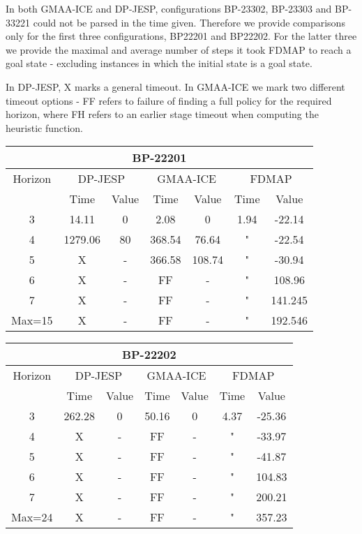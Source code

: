 \documentclass[letterpaper]{article} %
\begin{document}
In both GMAA-ICE and DP-JESP, configurations BP-23302, BP-23303 and BP-33221 could not be parsed in the time given. Therefore we provide comparisons only for the first three configurations, BP22201 and BP22202. For the latter three we provide the maximal and average number of steps it took FDMAP to reach a goal state - excluding instances in which the initial state is a goal state.

In DP-JESP, X marks a general timeout. In GMAA-ICE we mark two different timeout options - FF refers to failure of finding a full policy for the required horizon, where FH refers to an earlier stage timeout when computing the heuristic function.

\begin{center}
    \begin{tabular}{||c|c|c|c|c|c|c||}
         \hline
         \multicolumn{7}{||c||}{BP-22201} \\
         \hline
         Horizon & \multicolumn{2}{|c|}{DP-JESP} & \multicolumn{2}{|c|}{GMAA-ICE} & \multicolumn{2}{|c||}{FDMAP}\\ 
         \hline
         & Time & Value & Time & Value & Time & Value \\
         \hline
         3 & 14.11 & 0 & 2.08 & 0 & 1.94 & -22.14 \\
         \hline
         4 & 1279.06 & 80 & 368.54 & 76.64 & " & -22.54 \\
         \hline
         5 & X & - & 366.58 & 108.74 & " & -30.94 \\ 
         \hline
         6 & X & - & FF & - & " & 108.96 \\
         \hline
         7 & X & - & FF & - & " & 141.245 \\
         \hline
         Max=15 & X & - & FF & - & " & 192.546 \\
         \hline
    \end{tabular}
\end{center}

\begin{center}
    \begin{tabular}{||c|c|c|c|c|c|c||}
         \hline
         \multicolumn{7}{||c||}{BP-22202} \\
         \hline
         Horizon & \multicolumn{2}{|c|}{DP-JESP} & \multicolumn{2}{|c|}{GMAA-ICE} & \multicolumn{2}{|c||}{FDMAP}\\ 
         \hline
         & Time & Value & Time & Value & Time & Value \\
         \hline
         3 & 262.28 & 0 & 50.16 & 0 & 4.37 & -25.36 \\
         \hline
         4 & X & - & FF & - & " & -33.97 \\
         \hline
         5 & X & - & FF & - & " & -41.87 \\ 
         \hline
         6 & X & - & FF & - & " & 104.83 \\
         \hline
         7 & X & - & FF & - & " & 200.21 \\
         \hline
         Max=24 & X & - & FF & - & " & 357.23 \\
         \hline
    \end{tabular}
\end{center}
\end{document}

